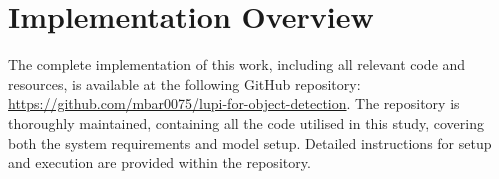 \chapter{Implementation Overview}

The complete implementation of this work, including all relevant code and resources, is available at the following GitHub repository: \href{https://github.com/mbar0075/lupi-for-object-detection}{https://github.com/mbar0075/lupi-for-object-detection}. The repository is thoroughly maintained, containing all the code utilised in this study, covering both the system requirements and model setup. Detailed instructions for setup and execution are provided within the repository.
